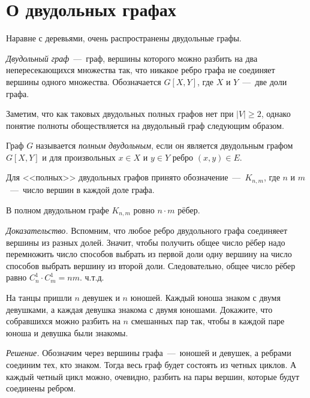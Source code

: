 \newpage
\section{О двудольных графах}

Наравне с деревьями, очень распространены двудольные графы.
	
	
\begin{definition}
	\emph{Двудольный граф}~---~граф, вершины которого можно разбить на два непересекающихся множества так, что никакое ребро графа не соединяет вершины одного множества. Обозначается $G[X, Y]$, где $X$ и $Y$~---~две доли графа.
\end{definition}

	Заметим, что как таковых двудольных полных графов нет при $|V| \geqslant 2$, однако понятие полноты обоществляется на двудольный граф следующим образом.
	
\begin{definition}
	Граф $G$ называется \emph{полным двудольным}, если он является двудольным графом $G[X, Y]$ и для произвольных $x \in X$ и $y \in Y$ ребро $(x, y) \in E$.
\end{definition}

	Для <<полных>> двудольных графов принято обозначение~---~$K_{n,m}$, где $n$ и $m$~---~число вершин в каждой доле графа.

\begin{statement}
	В полном двудольном графе $K_{n, m}$ ровно $n\cdot m$ рёбер.
	
	\emph{Доказательство.} Вспомним, что любое ребро двудольного графа соединяеет вершины из разных долей. Значит, чтобы получить общее число рёбер надо перемножить число способов выбрать из первой доли одну вершину на число способов выбрать вершину из второй доли. Следовательно, общее число рёбер равно $C_n^1 \cdot C_m^1 = nm$. ч.т.д.
\end{statement}
	
\begin{example}
	На танцы пришли $n$ девушек и $n$ юношей. Каждый юноша знаком с двумя девушками, а каждая девушка знакома с двумя юношами. Докажите, что собравшихся можно разбить на $n$ смешанных пар так, чтобы в каждой паре юноша и девушка были знакомы.
	
	\emph{Решение.} Обозначим через вершины графа~---~юношей и девушек, а ребрами соединим тех, кто знаком. Тогда весь граф будет состоять из четных циклов. А каждый четный цикл можно, очевидно, разбить на пары вершин, которые будут соединены ребром.
\end{example}

